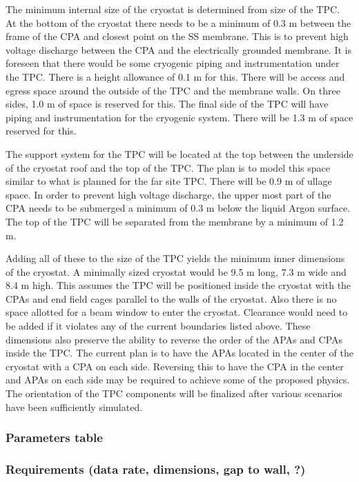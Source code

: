 The minimum internal size of the cryostat is determined from size of the TPC.  At the bottom of the 
cryostat there needs to be a minimum of 0.3 m between the frame of the CPA and closest point on the SS membrane.  This is to prevent high voltage discharge between the CPA and the electrically grounded membrane. It is foreseen that there would be some cryogenic piping and instrumentation under the TPC.  There is a height allowance of 0.1 m for this.  There will be access and egress space around the outside of the TPC and the membrane walls.  On three sides, 1.0 m of space is reserved for this.  The final side of the TPC will have piping and instrumentation for the cryogenic system.  There will be 1.3 m of space reserved for this.  

The support system for the TPC will be located at the top between the underside of the cryostat roof and  the top of the TPC.  The plan is to model this space similar to what is planned for the far site TPC.  There will be 0.9 m of ullage space.  In order to prevent high voltage discharge, the upper most part of the CPA needs to be submerged a minimum of 0.3 m below the liquid Argon surface.  The top of the TPC will be separated from the membrane by a minimum of 1.2 m.  

Adding all of these to the size of the TPC yields the minimum inner dimensions of the cryostat.  A minimally sized cryostat would be 9.5 m long, 7.3 m wide and 8.4 m high.  This assumes the TPC will be positioned inside the cryostat with the CPAs and end field cages parallel to the walls of the cryostat.  Also there is no space allotted for a beam window to enter the cryostat.  Clearance would need to be added if it violates any of the current boundaries listed above.  
These dimensions also preserve the ability to reverse the order of the APAs and CPAs inside the TPC.  The current plan is to have the APAs located in the center of the cryostat with a CPA on each side.  Reversing this to have the CPA in the center and APAs on each side may be required to achieve some of the proposed physics.  The orientation of the TPC components will be finalized after various scenarios have been sufficiently simulated.  


\subsubsection{Parameters table}
\subsubsection{Requirements (data rate, dimensions, gap to wall,  ?)}
